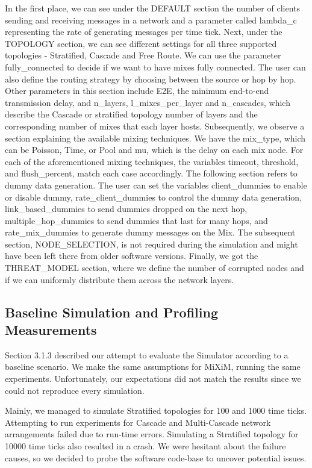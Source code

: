 \documentclass[logo,msc,cyber]{infthesis}   %
\begin{document}
In the first place, we can see under the DEFAULT section the number of clients
sending and receiving messages in a network and a parameter called lambda\_c
representing the rate of generating messages per time tick. Next, under the
TOPOLOGY section, we can see different settings for all three supported
topologies - Stratified, Cascade and Free Route. We can use the parameter
fully\_connected to decide if we want to have mixes fully connected. The user can
also define the routing strategy by choosing between the source or hop by hop.
Other parameters in this section include E2E, the minimum end-to-end
transmission delay, and n\_layers, l\_mixes\_per\_layer and n\_cascades, which
describe the Cascade or stratified topology number of layers and the
corresponding number of mixes that each layer hosts. Subsequently, we observe a
section explaining the available mixing techniques. We have the mix\_type, which
can be Poisson, Time, or Pool and mu, which is the delay on each mix node. For
each of the aforementioned mixing techniques, the variables timeout, threshold,
and flush\_percent, match each case accordingly. The following section refers to
dummy data generation. The user can set the variables client\_dummies to enable
or disable dummy, rate\_client\_dummies to control the dummy data generation,
link\_based\_dummies to send dummies dropped on the next hop, multiple\_hop\_dummies
to send dummies that last for many hops, and rate\_mix\_dummies to generate dummy
messages on the Mix. The subsequent section, NODE\_SELECTION, is not required
during the simulation and might have been left there from older software
versions. Finally, we got the THREAT\_MODEL section, where we define the number
of corrupted nodes and if we can uniformly distribute them across the network
layers.

\subsection{Baseline Simulation and Profiling Measurements}

Section 3.1.3 described our attempt to evaluate the Simulator according to a
baseline scenario. We make the same assumptions for MiXiM, running the same
experiments. Unfortunately, our expectations did not match the results since we
could not reproduce every simulation.

Mainly, we managed to simulate Stratified topologies for 100 and 1000 time
ticks. Attempting to run experiments for Cascade and Multi-Cascade network
arrangements failed due to run-time errors. Simulating a Stratified topology for
10000 time ticks also resulted in a crash. We were hesitant about the failure
causes, so we decided to probe the software code-base to uncover potential
issues.
\end{document}
